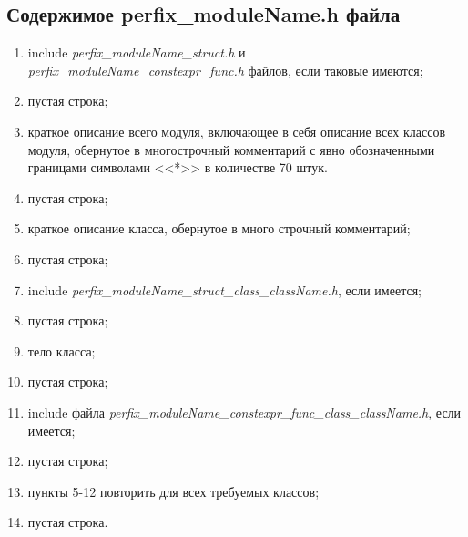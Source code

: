 \subsection{Содержимое perfix\_moduleName.h файла}\label{p:modul:h}
\begin{enumerate}
	\item include \textit{perfix\_moduleName\_struct.h} и \textit{perfix\_moduleName\_constexpr\_func.h}  файлов, если таковые имеются;
	\item пустая строка;
	\item краткое описание всего модуля, включающее в себя описание всех классов модуля, обернутое в многострочный комментарий с явно обозначенными границами символами <<*>> в количестве 70 штук.
	\item пустая строка;
	\item краткое описание класса, обернутое в много строчный комментарий;
	\item пустая строка;
	\item include \textit{perfix\_moduleName\_struct\_class\_className.h}, если имеется;
	\item пустая строка;
	\item тело класса;
	\item пустая строка;
	\item include файла \textit{perfix\-\_moduleName\-\_constexpr\-\_func\-\_class\-\_className.h}, если имеется;
	\item пустая строка;
	\item пункты 5-12 повторить для всех требуемых классов;
	\item пустая строка.
\end{enumerate}
